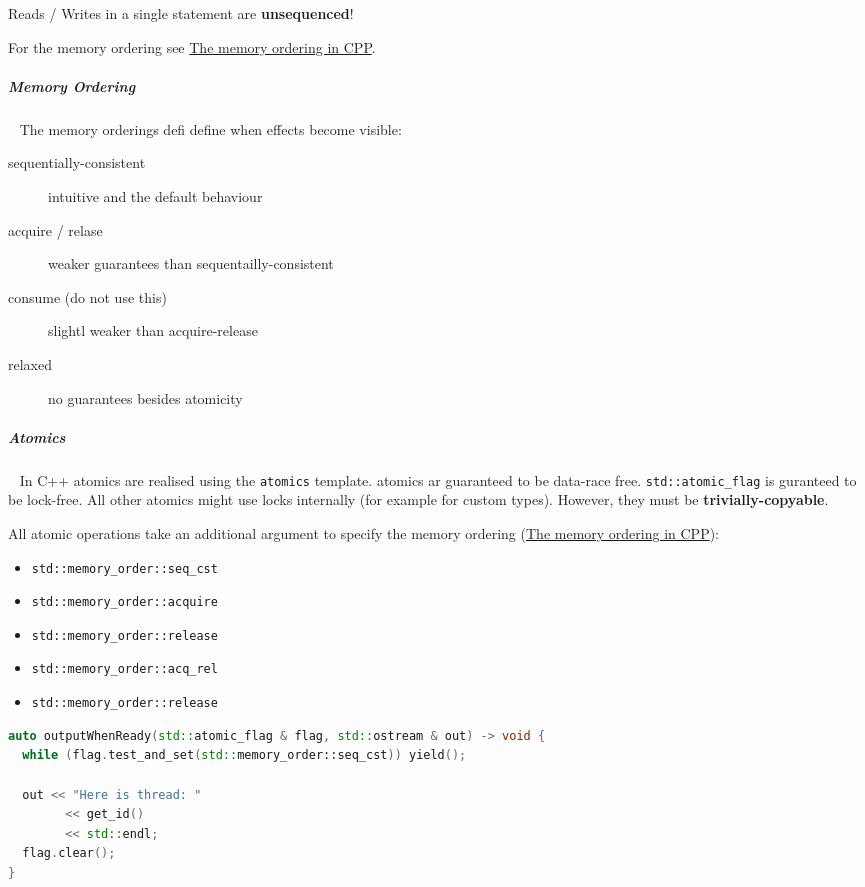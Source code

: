 \documentclass[11pt,twoside,landscape]{article}
\begin{document}
\begin{multicols}{2}
Reads / Writes in a single statement are \textbf{unsequenced}!

For the memory ordering see \href{../../../roam/20230629160255-the_memory_ordering_in_cpp.org}{The memory ordering in CPP}.

\subparagraph{Memory Ordering} \
\label{sec:org84cffe5}
The memory orderings defi define when effects become visible:
\begin{description}
\item[{sequentially-consistent}] intuitive and the default behaviour
\item[{acquire / relase}] weaker guarantees than sequentailly-consistent
\item[{consume (do not use this)}] slightl weaker than acquire-release
\item[{relaxed}] no guarantees besides atomicity
\end{description}

\subparagraph{Atomics} \
\label{sec:orga4b0d37}
In C++ atomics are realised using the \texttt{atomics} template.
atomics ar guaranteed to be data-race free.
\texttt{std::atomic\_flag} is guranteed to be lock-free.
All other atomics might use locks internally (for example for custom types).
However, they must be \textbf{trivially-copyable}.

All atomic operations take an additional argument to specify the memory ordering (\href{../../../roam/20230629160255-the_memory_ordering_in_cpp.org}{The memory ordering in CPP}):
\begin{itemize}
\item \texttt{std::memory\_order::seq\_cst}
\item \texttt{std::memory\_order::acquire}
\item \texttt{std::memory\_order::release}
\item \texttt{std::memory\_order::acq\_rel}
\item \texttt{std::memory\_order::release}
\end{itemize}


\begin{lstlisting}[language=c++,label=lst:org7d20a91,caption={Example for atomic\textsubscript{flag}},captionpos=b,numbers=none]
auto outputWhenReady(std::atomic_flag & flag, std::ostream & out) -> void {
  while (flag.test_and_set(std::memory_order::seq_cst)) yield();

  out << "Here is thread: "
        << get_id()
        << std::endl;
  flag.clear();
}
\end{lstlisting}


\end{multicols}
\end{document}

